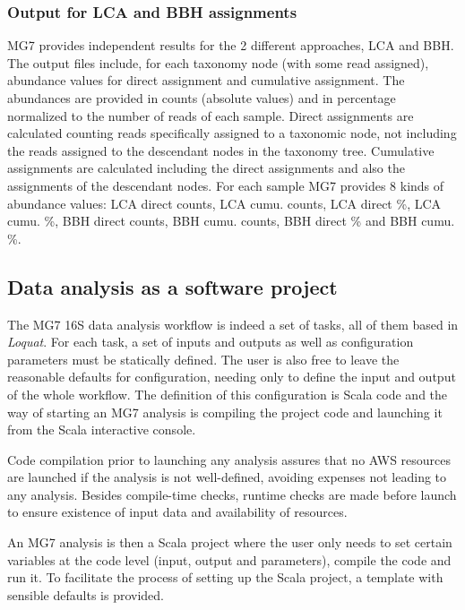 \documentclass[fontsize=8pt,paper=a4,pagesize,abstracton]{scrartcl}
\begin{document}
\subsubsection{Output for LCA and BBH
assignments}\label{output-for-lca-and-bbh-assignments}

MG7 provides independent results for the 2 different approaches, LCA and
BBH. The output files include, for each taxonomy node (with some read
assigned), abundance values for direct assignment and cumulative
assignment. The abundances are provided in counts (absolute values) and
in percentage normalized to the number of reads of each sample. Direct
assignments are calculated counting reads specifically assigned to a
taxonomic node, not including the reads assigned to the descendant nodes
in the taxonomy tree. Cumulative assignments are calculated including
the direct assignments and also the assignments of the descendant nodes.
For each sample MG7 provides 8 kinds of abundance values: LCA direct
counts, LCA cumu. counts, LCA direct \%, LCA cumu. \%, BBH direct
counts, BBH cumu. counts, BBH direct \% and BBH cumu. \%.

\subsection{Data analysis as a software
project}\label{data-analysis-as-a-software-project}

The MG7 16S data analysis workflow is indeed a set of tasks, all of them
based in \emph{Loquat}. For each task, a set of inputs and outputs as
well as configuration parameters must be statically defined. The user is
also free to leave the reasonable defaults for configuration, needing
only to define the input and output of the whole workflow. The
definition of this configuration is Scala code and the way of starting
an MG7 analysis is compiling the project code and launching it from the
Scala interactive console.

Code compilation prior to launching any analysis assures that no AWS
resources are launched if the analysis is not well-defined, avoiding
expenses not leading to any analysis. Besides compile-time checks,
runtime checks are made before launch to ensure existence of input data
and availability of resources.

An MG7 analysis is then a Scala project where the user only needs to set
certain variables at the code level (input, output and parameters),
compile the code and run it. To facilitate the process of setting up the
Scala project, a template with sensible defaults is provided.
\end{document}
